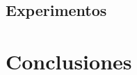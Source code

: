 \documentclass[9pt,a4paper,twocolumn,twoside]{tau-class/tau}
\begin{document}
    \subsection{Experimentos}


\section{Conclusiones}


\printbibliography

\end{document}
